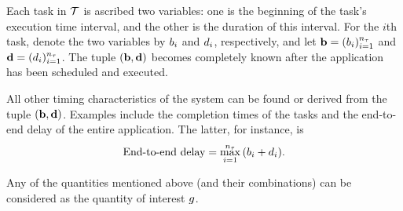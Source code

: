 Each task in $\mathcal{T}$ is ascribed two variables: one is the beginning of the
task's execution time interval, and the other is the duration of this interval.
For the $i$th task, denote the two variables by $b_i$ and $d_i$, respectively,
and let $\mathbf{b} = (b_i)_{i=1}^{{n_\tau}}$ and $\mathbf{d} = (d_i)_{i=1}^{{n_\tau}}$. The tuple
$(\mathbf{b}, \mathbf{d})$ becomes completely known after the application has been scheduled
and executed.

All other timing characteristics of the system can be found or derived from the
tuple $(\mathbf{b}, \mathbf{d})$. Examples include the completion times of the tasks and the
end-to-end delay of the entire application. The latter, for instance, is
\begin{equation} \elab{end-to-end-delay}
  \text{End-to-end delay} = \max_{i = 1}^\nt \, (\b_i + \d_i).
\end{equation}

Any of the quantities mentioned above (and their combinations) can be considered
as the quantity of interest $g$.
